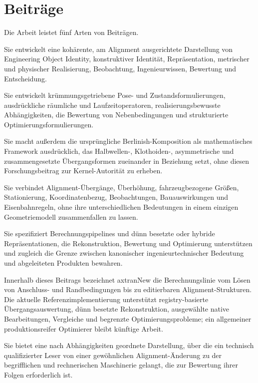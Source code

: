 \section{Beiträge}

Die Arbeit leistet fünf Arten von Beiträgen.

\begin{description}[style=nextline]
\item[Begrifflicher Beitrag]
Sie entwickelt eine kohärente, am Alignment ausgerichtete Darstellung von
Engineering Object Identity, konstruktiver Identität, Repräsentation,
metrischer und physischer Realisierung, Beobachtung, Ingenieurwissen, Bewertung
und Entscheidung.

\item[Formaler und methodischer Beitrag]
Sie entwickelt krümmungsgetriebene Pose- und Zustandsformulierungen,
ausdrückliche räumliche und Laufzeitoperatoren,
realisierungsbewusste Abhängigkeiten, die Bewertung von Nebenbedingungen und
strukturierte Optimierungsformulierungen.

Sie macht außerdem die ursprüngliche Berlinish-Komposition als mathematisches
Framework ausdrücklich, das Halbwellen-, Klothoiden-, asymmetrische und
zusammengesetzte Übergangsformen zueinander in Beziehung setzt, ohne diesen
Forschungsbeitrag zur Kernel-Autorität zu erheben.

\item[Ingenieurtechnischer Beitrag]
Sie verbindet Alignment-Übergänge, Überhöhung, fahrzeugbezogene Größen,
Stationierung, Koordinatenbezug, Beobachtungen, Bauauswirkungen und
Eisenbahnregeln, ohne ihre unterschiedlichen Bedeutungen in einem einzigen
Geometriemodell zusammenfallen zu lassen.

\item[Implementierungs- und Referenzbeitrag]
Sie spezifiziert Berechnungspipelines und dünn besetzte oder hybride
Repräsentationen, die Rekonstruktion, Bewertung und Optimierung unterstützen
und zugleich die Grenze zwischen kanonischer ingenieurtechnischer Bedeutung
und abgeleiteten Produkten bewahren.

Innerhalb dieses Beitrags bezeichnet axtranNew die Berechnungslinie vom Lösen
von Anschluss- und Randbedingungen bis zu editierbaren Alignment-Strukturen.
Die aktuelle Referenzimplementierung unterstützt registry-basierte
Übergangsauswertung, dünn besetzte Rekonstruktion, ausgewählte native
Bearbeitungen, Vergleiche und begrenzte Optimierungsprobleme; ein allgemeiner
produktionsreifer Optimierer bleibt künftige Arbeit.

\item[Erklärungsbeitrag]
Sie bietet eine nach Abhängigkeiten geordnete Darstellung, über die ein
technisch qualifizierter Leser von einer gewöhnlichen Alignment-Änderung zu
der begrifflichen und rechnerischen Maschinerie gelangt, die zur Bewertung
ihrer Folgen erforderlich ist.
\end{description}

